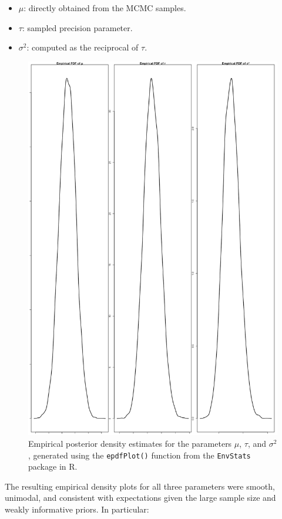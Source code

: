 \documentclass[]{article}
\begin{document}
\begin{itemize}
	\item $\mu$: directly obtained from the MCMC samples.
	\item $\tau$: sampled precision parameter.
	\item $\sigma^2$: computed as the reciprocal of $\tau$.
\end{itemize}


\begin{figure}[H]
	\centering
	\includegraphics[width=0.7\linewidth]{img/img-endfplot}
	\caption{Empirical posterior density estimates for the parameters $\mu$, $\tau$, and $\sigma^2$, generated using the \texttt{epdfPlot()} function from the \texttt{EnvStats} package in R.}
	\label{fig:img-endfplot}
\end{figure}

The resulting empirical density plots for all three parameters were smooth, unimodal, and consistent with expectations given the large sample size and weakly informative priors. In particular:
\end{document}
